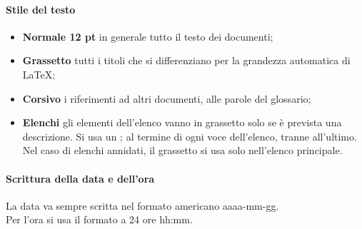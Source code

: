 \paragraph{Stile del testo}
\begin{itemize}
        \item \textbf{Normale 12 pt} in generale tutto il testo dei documenti;
        \item \textbf{Grassetto} tutti i titoli che si differenziano per la grandezza automatica di \LaTeX ;
        \item \textbf{Corsivo} i riferimenti ad altri documenti, alle parole del glossario;
        \item \textbf{Elenchi} gli elementi dell'elenco vanno in grassetto solo se è prevista una descrizione. 
                                Si usa un ; al termine di ogni voce dell'elenco, tranne all'ultimo. \\
                                Nel caso di elenchi annidati, il grassetto si usa solo nell'elenco principale.
\end{itemize}

\paragraph{Scrittura della data e dell'ora} \hfill \break
La data va sempre scritta nel formato americano aaaa-mm-gg. \\
Per l'ora si usa il formato a 24 ore hh:mm.

